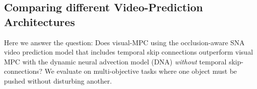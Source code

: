 


\subsection{Comparing different Video-Prediction Architectures}
\label{subsec:sna_experiments}
Here we answer the question: Does  visual-MPC using the occlusion-aware SNA video prediction model that includes temporal skip connections outperform visual MPC with the dynamic neural advection model (DNA)\cite{foresight} \emph{without} temporal skip-connections?
We evaluate on multi-objective tasks where one object must be pushed without disturbing another.

	
	
